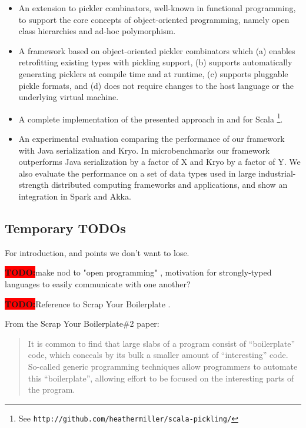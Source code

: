 \documentclass[preprint,10pt]{sigplanconf}
\theoremstyle{definition}
\newcommand{\todo}{{\bf \colorbox{red}{\color{white}TODO:}}}
\begin{document}
\begin{itemize}

\item An extension to pickler combinators, well-known in functional
programming,  to support the core concepts of object-oriented programming,
namely open class hierarchies and ad-hoc polymorphism.

\item A framework based on object-oriented pickler combinators which (a)
enables retrofitting existing types with pickling support, (b) supports
automatically generating picklers at compile time and at runtime, (c) supports
pluggable pickle formats, and (d) does not require changes to the host
language or the underlying virtual machine.

\item A complete implementation of the presented approach in and for Scala \footnote{See
    \texttt{http://github.com/heathermiller/scala-pickling/}}.

\item An experimental evaluation comparing the performance of our framework
with Java serialization and Kryo. In microbenchmarks our framework outperforms
Java serialization by a factor of X and Kryo by a factor of Y. We also
evaluate the performance on a set of data types used in large industrial-
strength distributed computing frameworks and applications, and show an
integration in Spark and Akka.

\end{itemize}

\subsection{Temporary TODOs}

For introduction, and points we don't want to lose.

\todo make nod to "open programming" \cite{Rossberg2007}, motivation for strongly-typed languages to easily communicate with one another?

\todo Reference to Scrap Your Boilerplate \cite{Lammel2004}.

From the Scrap Your Boilerplate\#2 paper:
\begin{quote}
It is common to find that large slabs of a program consist of ``boilerplate'' code, which conceals by its bulk a smaller amount of ``interesting'' code. So-called generic programming techniques allow programmers to automate this ``boilerplate'', allowing effort to be focused on the interesting parts of the program.
\end{quote}
\end{document}
